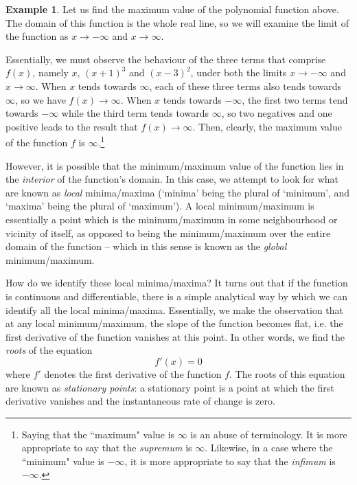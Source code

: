 \documentclass[a4paper]{article}
\theoremstyle{definition}
\newtheorem{example}{Example}[section]
\begin{document}
\begin{example}
	Let us find the maximum value of the polynomial function above.
	The domain of this function is the whole real line, so we will examine the limit of the function as $x \rightarrow -\infty$ and $x \rightarrow \infty$.

	Essentially, we must observe the behaviour of the three terms that comprise $f(x)$, namely $x$, $(x + 1)^3$ and $(x - 3)^2$, under both the limits $x \rightarrow -\infty$ and $x \rightarrow \infty$.
	When $x$ tends towards $\infty$, each of these three terms also tends towards $\infty$, so we have $f(x) \rightarrow \infty$.
	When $x$ tends towards $-\infty$, the first two terms tend towards $-\infty$ while the third term tends towards $\infty$, so two negatives and one positive leads to the result that $f(x) \rightarrow \infty$.
	Then, clearly, the maximum value of the function $f$ is $\infty$.\footnote{
		Saying that the ``maximum" value is $\infty$ is an abuse of terminology.
		It is more appropriate to say that the \textit{supremum} is $\infty$.
		Likewise, in a case where the ``minimum" value is $-\infty$, it is more appropriate to say that the \textit{infimum} is $-\infty$.
	}
\end{example}

However, it is possible that the minimum/maximum value of the function lies in the \textit{interior} of the function's domain.
In this case, we attempt to look for what are known as \textit{local} minima/maxima (`minima' being the plural of `minimum', and `maxima' being the plural of `maximum').
A local minimum/maximum is essentially a point which is the minimum/maximum in some neighbourhood or vicinity of itself, as opposed to being the minimum/maximum over the entire domain of the function -- which in this sense is known as the \textit{global} minimum/maximum.

How do we identify these local minima/maxima?
It turns out that if the function is continuous and differentiable, there is a simple analytical way by which we can identify all the local minima/maxima.
Essentially, we make the observation that at any local minimum/maximum, the slope of the function becomes flat, i.e. the first derivative of the function vanishes at this point.
In other words, we find the \textit{roots} of the equation
\begin{equation*}
	f'(x) = 0
\end{equation*}
where $f'$ denotes the first derivative of the function $f$.
The roots of this equation are known as \textit{stationary points}: a stationary point is a point at which the first derivative vanishes and the instantaneous rate of change is zero.
\end{document}
